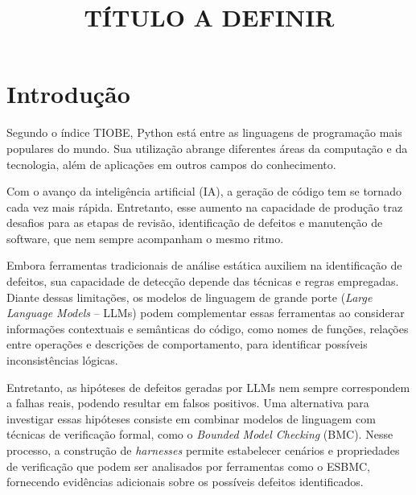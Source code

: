 \documentclass[conference]{IEEEtran}
\begin{document}
\title{TÍTULO A DEFINIR}

\author{
}

\maketitle

\begin{abstract}
\end{abstract}

\begin{IEEEkeywords}
\end{IEEEkeywords}

\section{Introdução}


Segundo o índice TIOBE, Python está entre as linguagens de programação mais populares do mundo. Sua utilização abrange diferentes áreas da computação e da tecnologia, além de aplicações em outros campos do conhecimento.

Com o avanço da inteligência artificial (IA), a geração de código tem se tornado cada vez mais rápida. Entretanto, esse aumento na capacidade de produção traz desafios para as etapas de revisão, identificação de defeitos e manutenção de software, que nem sempre acompanham o mesmo ritmo.

Embora ferramentas tradicionais de análise estática auxiliem na identificação de defeitos, sua capacidade de detecção depende das técnicas e regras empregadas. Diante dessas limitações, os modelos de linguagem de grande porte (\textit{Large Language Models} -- LLMs) podem complementar essas ferramentas ao considerar informações contextuais e semânticas do código, como nomes de funções, relações entre operações e descrições de comportamento, para identificar possíveis inconsistências lógicas.

Entretanto, as hipóteses de defeitos geradas por LLMs nem sempre correspondem a falhas reais, podendo resultar em falsos positivos. Uma alternativa para investigar essas hipóteses consiste em combinar modelos de linguagem com técnicas de verificação formal, como o \textit{Bounded Model Checking} (BMC). Nesse processo, a construção de \textit{harnesses} permite estabelecer cenários e propriedades de verificação que podem ser analisados por ferramentas como o ESBMC, fornecendo evidências adicionais sobre os possíveis defeitos identificados.
\end{document}

